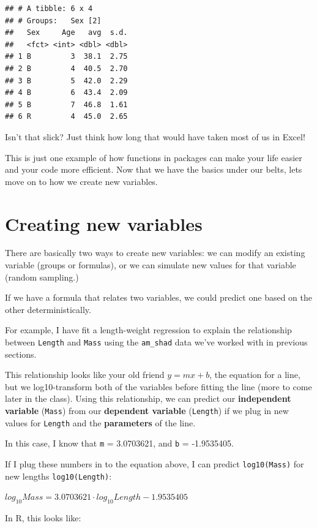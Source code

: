 \documentclass[
]{book}
\begin{document}
\begin{verbatim}
## # A tibble: 6 x 4
## # Groups:   Sex [2]
##   Sex     Age   avg  s.d.
##   <fct> <int> <dbl> <dbl>
## 1 B         3  38.1  2.75
## 2 B         4  40.5  2.70
## 3 B         5  42.0  2.29
## 4 B         6  43.4  2.09
## 5 B         7  46.8  1.61
## 6 R         4  45.0  2.65
\end{verbatim}

Isn't that slick? Just think how long that would have taken most of us in Excel!

This is just one example of how functions in packages can make your life easier and your code more efficient. Now that we have the basics under our belts, lets move on to how we create new variables.

\hypertarget{creating-new-variables}{%
\section{Creating new variables}\label{creating-new-variables}}

There are basically two ways to create new variables: we can modify an existing variable (groups or formulas), or we can simulate new values for that variable (random sampling.)

If we have a formula that relates two variables, we could predict one based on the other deterministically.

For example, I have fit a length-weight regression to explain the relationship between \texttt{Length} and \texttt{Mass} using the \texttt{am\_shad} data we've worked with in previous sections.

This relationship looks like your old friend \(y = mx + b\), the equation for a line, but we log10-transform both of the variables before fitting the line (more to come later in the class). Using this relationship, we can predict our \textbf{independent variable} (\texttt{Mass}) from our \textbf{dependent variable} (\texttt{Length}) if we plug in new values for \texttt{Length} and the \textbf{parameters} of the line.

In this case, I know that \texttt{m} = 3.0703621, and \texttt{b} = -1.9535405.

If I plug these numbers in to the equation above, I can predict \texttt{log10(Mass)} for new lengths \texttt{log10(Length)}:

\(log_{10}Mass = 3.0703621 \cdot log_{10}Length - 1.9535405\)

In R, this looks like:
\end{document}
